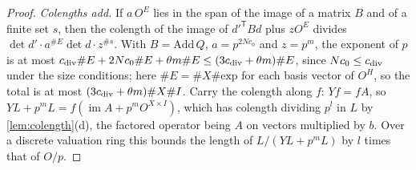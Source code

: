 \begin{proof}
\emph{Colengths add.} If $a\,O^E$ lies in the span of the image of a matrix $B$ and of a finite set $s$, then the colength of the image of $d'^{\mathsf T}Bd$ plus $zO^E$ divides $\det d'\cdot a^{\#E}\det d\cdot z^{\#s}$. With $B=\mathrm{Add}\,Q$, $a=p^{2Nc_0}$ and $z=p^m$, the exponent of $p$ is at most $c_{\rm div}\#E+2Nc_0\#E+\theta m\#E\le(3c_{\rm div}+\theta m)\#E$, since $Nc_0\le c_{\rm div}$ under the size conditions;
here $\#E=\#X\#\mathrm{exp}$ for each basis vector of $O^H$, so the total is at most $(3c_{\rm div}+\theta m)\#X\#I$. Carry the colength along $f$: $Yf=fA$, so $YL+p^mL=f(\operatorname{im}A+p^mO^{X\times I})$, which has colength dividing $p^l$ in $L$ by \cref{lem:colength}(d), the factored operator being $A$ on vectors multiplied by $b$. Over a discrete
valuation ring this bounds the length of $L/(YL+p^mL)$ by $l$ times that of $O/p$.
\end{proof}
